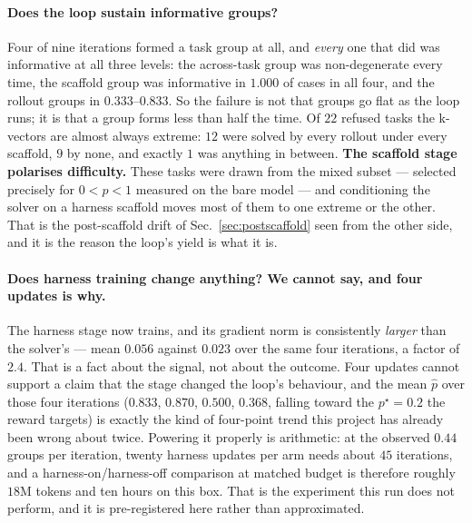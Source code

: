 \paragraph{Does the loop sustain informative groups?} Four of nine iterations formed a task
group at all, and \emph{every} one that did was informative at all three levels: the across-task
group was non-degenerate every time, the scaffold group was informative in $1.000$ of cases in
all four, and the rollout groups in $0.333$--$0.833$. So the failure is not that groups go flat
as the loop runs; it is that a group forms less than half the time. Of $22$ refused tasks the
k-vectors are almost always extreme: $12$ were solved by every rollout under every
scaffold, $9$ by none, and exactly $1$ was anything in between. \textbf{The scaffold stage polarises difficulty.} These tasks were
drawn from the mixed subset --- selected precisely for $0 < p < 1$ measured on the bare model
--- and conditioning the solver on a harness scaffold moves most of them to one extreme or the
other. That is the post-scaffold drift of Sec.~\ref{sec:postscaffold} seen from the other side,
and it is the reason the loop's yield is what it is.

\paragraph{Does harness training change anything? We cannot say, and four updates is why.} The
harness stage now trains, and its gradient norm is consistently \emph{larger} than the solver's
--- mean $0.056$ against $0.023$ over the same four iterations, a factor of $2.4$. That is a
fact about the signal, not about the outcome. Four updates cannot support a claim that the
stage changed the loop's behaviour, and the mean $\hat{p}$ over those four iterations
($0.833$, $0.870$, $0.500$, $0.368$, falling toward the $p^\star = 0.2$ the reward targets) is
exactly the kind of four-point trend this project has already been wrong about twice. Powering
it properly is arithmetic: at the observed $0.44$ groups per iteration, twenty harness updates
per arm needs about $45$ iterations, and a harness-on/harness-off comparison at matched budget
is therefore roughly $18$M tokens and ten hours on this box. That is the experiment this run
does not perform, and it is pre-registered here rather than approximated.

